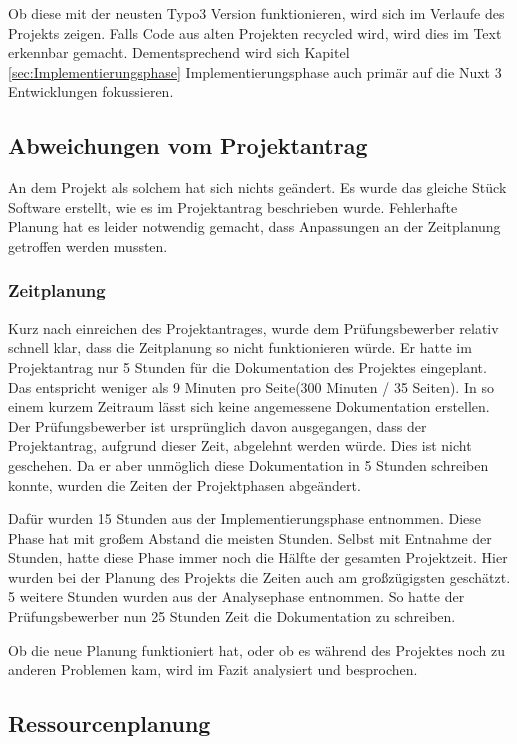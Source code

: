Ob diese mit der neusten Typo3 Version funktionieren, wird sich im Verlaufe des Projekts zeigen. Falls Code aus alten Projekten recycled wird, wird dies im Text erkennbar gemacht. Dementsprechend wird sich Kapitel \ref{sec:Implementierungsphase} Implementierungsphase auch primär auf die Nuxt 3 Entwicklungen fokussieren.

\subsection{Abweichungen vom Projektantrag}
\label{sec:AbweichungenProjektantrag}

An dem Projekt als solchem hat sich nichts geändert. Es wurde das gleiche Stück Software erstellt, wie es im Projektantrag beschrieben wurde. Fehlerhafte Planung hat es leider notwendig gemacht, dass Anpassungen an der Zeitplanung getroffen werden mussten.


\subsubsection{Zeitplanung}
\label{sec:AbweichungenProjektantrag}

Kurz nach einreichen des Projektantrages, wurde dem Prüfungsbewerber relativ schnell klar, dass die Zeitplanung so nicht funktionieren würde. Er hatte im Projektantrag nur 5 Stunden für die Dokumentation des Projektes eingeplant. Das entspricht weniger als 9 Minuten pro Seite(300 Minuten / 35 Seiten). In so einem kurzem Zeitraum lässt sich keine angemessene Dokumentation erstellen. Der Prüfungsbewerber ist ursprünglich davon ausgegangen, dass der Projektantrag, aufgrund dieser Zeit, abgelehnt werden würde. Dies ist nicht geschehen. Da er aber unmöglich diese Dokumentation in 5 Stunden schreiben konnte, wurden die Zeiten der Projektphasen abgeändert. 

Dafür wurden 15 Stunden aus der Implementierungsphase entnommen. Diese Phase hat mit großem Abstand die meisten Stunden. Selbst mit Entnahme der Stunden, hatte diese Phase immer noch die Hälfte der gesamten Projektzeit. Hier wurden bei der Planung des Projekts die Zeiten auch am großzügigsten geschätzt. 5 weitere Stunden wurden aus der Analysephase entnommen. So hatte der Prüfungsbewerber nun 25 Stunden Zeit die Dokumentation zu schreiben.

Ob die neue Planung funktioniert hat, oder ob es während des Projektes noch zu anderen Problemen kam, wird im Fazit analysiert und besprochen.

\subsection{Ressourcenplanung}
\label{sec:Ressourcenplanung}

